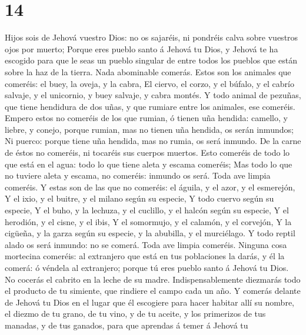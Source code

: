 \hypertarget{section-13}{%
\section{14}\label{section-13}}

 Hijos sois de Jehová vuestro Dios: no os sajaréis, ni
pondréis calva sobre vuestros ojos por muerto;  Porque eres
pueblo santo á Jehová tu Dios, y Jehová te ha escogido para que le seas
un pueblo singular de entre todos los pueblos que están sobre la haz de
la tierra.  Nada abominable comerás.  Estos son
los animales que comeréis: el buey, la oveja, y la cabra, 
El ciervo, el corzo, y el búfalo, y el cabrío salvaje, y el unicornio, y
buey salvaje, y cabra montés.  Y todo animal de pezuñas, que
tiene hendidura de dos uñas, y que rumiare entre los animales, ese
comeréis.  Empero estos no comeréis de los que rumian, ó
tienen uña hendida: camello, y liebre, y conejo, porque rumian, mas no
tienen uña hendida, os serán inmundos;  Ni puerco: porque
tiene uña hendida, mas no rumia, os será inmundo. De la carne de éstos
no comeréis, ni tocaréis sus cuerpos muertos.  Esto comeréis
de todo lo que está en el agua: todo lo que tiene aleta y escama
comeréis;  Mas todo lo que no tuviere aleta y escama, no
comeréis: inmundo os será.  Toda ave limpia comeréis.
 Y estas son de las que no comeréis: el águila, y el azor,
y el esmerejón,  Y el ixio, y el buitre, y el milano según
su especie,  Y todo cuervo según su especie, 
Y el buho, y la lechuza, y el cuclillo, y el halcón según su especie,
 Y el herodión, y el cisne, y el ibis,  Y el
somormujo, y el calamón, y el corvejón,  Y la cigüeña, y la
garza según su especie, y la abubilla, y el murciélago.  Y
todo reptil alado os será inmundo: no se comerá.  Toda ave
limpia comeréis.  Ninguna cosa mortecina comeréis: al
extranjero que está en tus poblaciones la darás, y él la comerá: ó
véndela al extranjero; porque tú eres pueblo santo á Jehová tu Dios. No
cocerás el cabrito en la leche de su madre. 
Indispensablemente diezmarás todo el producto de tu simiente, que
rindiere el campo cada un año.  Y comerás delante de Jehová
tu Dios en el lugar que él escogiere para hacer habitar allí su nombre,
el diezmo de tu grano, de tu vino, y de tu aceite, y los primerizos de
tus manadas, y de tus ganados, para que aprendas á temer á Jehová tu

